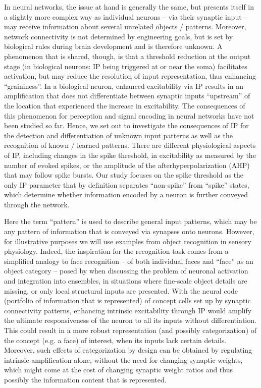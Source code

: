 In neural networks, the issue at hand is generally the same,
        but presents itself in a slightly more complex way as individual neurons
        -- via their synaptic input --
        may receive information about several unrelated objects / patterns.
        Moreover, network connectivity is not determined by engineering goals,
            but is set by biological rules during brain development and is therefore unknown.
    A phenomenon that is shared, though, is that a threshold reduction at the output stage
        (in biological neurons: IP being triggered at or near the soma) facilitates activation,
        but may reduce the resolution of input representation, thus enhancing ``graininess''.
    In a biological neuron, enhanced excitability via IP results in an amplification
        that does not differentiate between synaptic inputs ``upstream'' of the location
            that experienced the increase in excitability.
    The consequences of this phenomenon for perception and signal encoding in neural networks
        have not been studied so far.
    Hence, we set out to investigate the consequences of IP
        for the detection and differentiation of unknown input patterns
            as well as the recognition of known / learned patterns.
    There are different physiological aspects of IP,
        including changes in the spike threshold,
        in excitability as measured by the number of evoked spikes,
        or the amplitude of the afterhyperpolarization (AHP) that may follow spike bursts.
    Our study focuses on the spike threshold as the only IP parameter
        that by definition separates ``non-spike'' from ``spike'' states,
        which determine whether information encoded by a neuron is further conveyed through the network.

Here the term ``pattern'' is used to describe general input patterns,
        which may be any pattern of information that is conveyed via synapses onto neurons.
    However, for illustrative purposes we will use examples from object recognition in sensory physiology.
    Indeed, the inspiration for the recognition task comes from a simplified analogy to face recognition
        -- of both individual faces and ``face'' as an object category --
        posed by \cite{Titley2017-da} when discussing the problem of neuronal activation and integration into ensembles,
        in situations where fine-scale object details are missing,
            or only local structural inputs are presented.
    With the neural code (portfolio of information that is represented)
        of concept cells set up by synaptic connectivity patterns,
            enhancing intrinsic excitability through IP would
            amplify the ultimate responsiveness of the neuron to all its inputs without differentiation.
    This could result in a more robust representation
        (and possibly categorization) of the concept (e.g. a face) of interest,
        when its inputs lack certain details.
    Moreover, such effects of categorization by design can be obtained by
        regulating intrinsic amplification alone,
        without the need for changing synaptic weights,
        which might come at the cost of changing synaptic weight ratios
        and thus possibly the information content that is represented.

